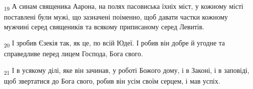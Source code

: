 \begin{tcolorbox}
\textsubscript{19} А синам священика Аарона, на полях пасовиська їхніх міст, у кожному місті поставлені були мужі, що зазначені поіменно, щоб давати частки кожному мужчині серед священиків та всякому приписаному серед Левитів.
\end{tcolorbox}
\begin{tcolorbox}
\textsubscript{20} І зробив Єзекія так, як це, по всій Юдеї. І робив він добре й угодне та справедливе перед лицем Господа, Бога свого.
\end{tcolorbox}
\begin{tcolorbox}
\textsubscript{21} І в усякому ділі, яке він зачинав, у роботі Божого дому, і в Законі, і в заповіді, щоб звертатися до Бога свого, робив він усім своїм серцем, і мав успіх.
\end{tcolorbox}
